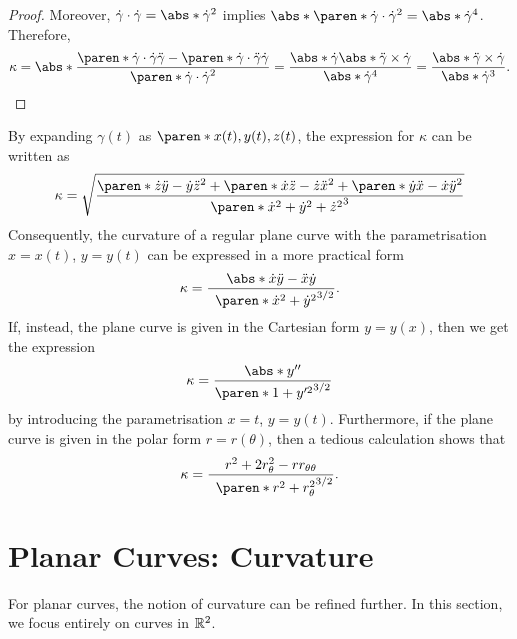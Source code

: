 \documentclass[11pt]{penrose}
\begin{document}
\begin{proof}
    Moreover, $\dot{\gamma} \cdot \dot{\gamma} = \abs*{\dot{\gamma}}^2$ implies $\abs*{ \paren*{\dot{\gamma} \cdot \dot{\gamma}}^2 } = \abs*{\dot{\gamma}}^4$. Therefore,
    \begin{equation}
        \kappa
        = \abs*{ \dfrac{ \paren*{\dot{\gamma} \cdot \dot{\gamma}} \ddot{\gamma} - \paren*{\dot{\gamma} \cdot \ddot{\gamma}} \dot{\gamma} }{ \paren*{\dot{\gamma} \cdot \dot{\gamma}}^2 } }
        = \frac{\abs*{ \dot{\gamma} } \abs*{ \ddot{\gamma} \times \dot{\gamma} }}{\abs*{\dot{\gamma}}^4}
        = \frac{\abs*{ \ddot{\gamma} \times \dot{\gamma} }}{\abs*{\dot{\gamma}}^3}.\qedhere
    \end{equation}
\end{proof}

By expanding $\gamma(t)$ as $\paren*{x(t), y(t), z(t)}$, the expression for $\kappa$ can be written as
\begin{equation}
    \kappa
    = \sqrt{ \frac{ \paren*{\dot{z}\ddot{y}-\dot{y}\ddot{z}}^2 + \paren*{\dot{x}\ddot{z}-\dot{z}\ddot{x}}^2 + \paren*{\dot{y}\ddot{x}-\dot{x}\ddot{y}}^2 }{\paren*{\dot{x}^2 + \dot{y}^2 + \dot{z}^2}^3} }
\end{equation}
Consequently, the curvature of a regular plane curve with the parametrisation $x = x(t)$, $y = y(t)$ can be expressed in a more practical form
\begin{equation}
    \kappa = \frac{\abs*{\dot{x}\ddot{y} - \ddot{x}\dot{y}}}{\phantom{1}\paren*{\dot{x}^2+\dot{y}^2}^{3/2}}.
\end{equation}
If, instead, the plane curve is given in the Cartesian form $y = y(x)$, then we get the expression
\begin{equation}
    \kappa = \frac{\abs*{y''}}{\paren*{1+y'^2}^{3/2}}
\end{equation}
by introducing the parametrisation $x = t$, $y =y(t)$. Furthermore, if the plane curve is given in the polar form $r = r(\theta)$, then a tedious calculation shows that
\begin{equation}
    \kappa = \frac{r^2 + 2 r_{\theta}^{2} - r r_{\theta\theta}}{\phantom{1}\paren*{r^{2}+r_{\theta}^{2}}^{3/2}}.
\end{equation}

\section{Planar Curves: Curvature}

For planar curves, the notion of curvature can be refined further. In this section, we focus entirely on curves in $\mathbb{R}^2$.
\end{document}
